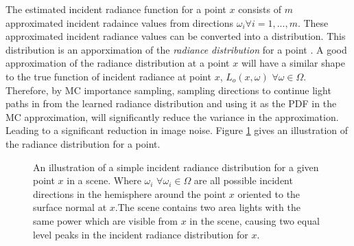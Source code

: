 \documentclass[../dissertation.tex]{subfiles}
\begin{document}
The estimated incident radiance function for a point $x$ consists of $m$ approximated incident radaince values from directions $\omega_i \forall i = 1,...,m$. These approximated incident radiance values can be converted into a distribution. This distribution is an apporximation of the \textit{radiance distribution} for a point \cite{greger1998irradiance}. A good approximation of the radiance distribution at a point $x$ will have a similar shape to the true function of incident radiance at point $x$, $L_o(x, \omega)$ $\forall \omega \in \Omega$. Therefore, by MC importance sampling, sampling directions to continue light paths in from the learned radiance distribution and using it as the PDF in the MC approximation, will significantly reduce the variance in the approximation. Leading to a significant reduction in image noise. Figure \ref{fig:incident_radiance_distribution} gives an illustration of the radiance distribution for a point.

\begin{figure}[h]
\centering
\begin{minipage}{0.4\textwidth}
\end{minipage}
\caption{An illustration of a simple incident radiance distribution for a given point $x$ in a scene. Where $\omega_i$ $\forall \omega_i \in \Omega$ are all possible incident directions in the hemisphere around the point $x$ oriented to the surface normal at $x$.The scene contains two area lights with the same power which are visible from $x$ in the scene, causing two equal level peaks in the incident radiance distribution for $x$.}
  \label{fig:incident_radiance_distribution}
\end{figure}
\end{document}
